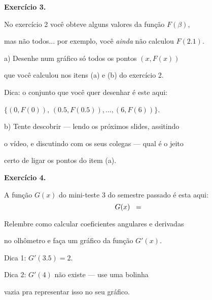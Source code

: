 \documentclass[oneside,12pt]{article}
\begin{document}
{\bf Exercício 3.}

No exercício 2 você obteve alguns valores da função $F(β)$,

mas não todos... por exemplo, você {\sl ainda} não calculou $F(2.1)$.

\msk

a) Desenhe num gráfico só todos os pontos $(x,F(x))$

que você calculou nos itens (a) e (b) do exercício 2.

Dica: o conjunto que você quer desenhar é este aqui:

$\{(0,F(0)), \, (0.5,F(0.5)), \ldots, (6,F(6))\}$.

\msk

b) Tente descobrir --- lendo os próximos slides, assitindo

o vídeo, e discutindo com os seus colegas --- qual é o jeito

certo de ligar os pontos do item (a).


\newpage


{\bf Exercício 4.}

A função $G(x)$ do mini-teste 3 do semestre passado é esta aqui:
%
\pu
%
$$G(x) \;\;=\;\;\,
    \unitlength=15pt
    \scalebox{0.7}{$\ga{Ex 4}$}
$$

Relembre como calcular coeficientes angulares e derivadas

no olhômetro e faça um gráfico da função $G'(x)$.

\ssk

Dica 1: $G'(3.5)=2$.

Dica 2: $G'(4)$ não existe --- use uma bolinha

vazia pra representar isso no seu gráfico.





\newpage
\end{document}
